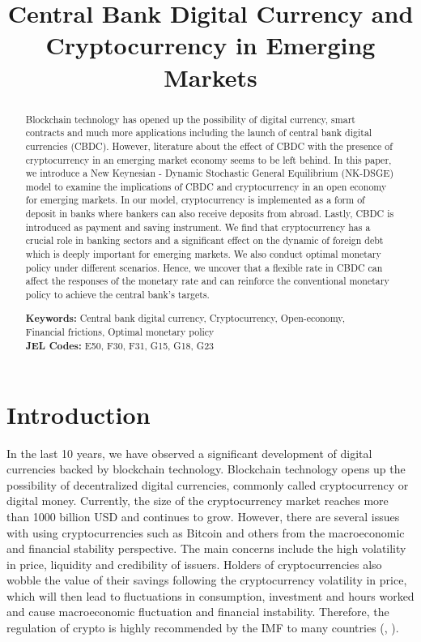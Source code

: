 \documentclass[12pt, a4paper]{article}
\title{Central Bank Digital Currency and Cryptocurrency in Emerging Markets }
\date{}
\begin{document}
\maketitle
\begin{abstract}

\noindent Blockchain technology has opened up the possibility of digital currency, smart contracts and much more applications including the launch of central bank digital currencies (CBDC). However, literature about the effect of CBDC with the presence of cryptocurrency in an emerging market economy seems to be left behind. In this paper, we introduce a New Keynesian - Dynamic Stochastic General Equilibrium (NK-DSGE) model to examine the implications of CBDC and cryptocurrency in an open economy for emerging markets. In our model, cryptocurrency is implemented as a form of deposit in banks where bankers can also receive deposits from abroad. Lastly, CBDC is introduced as payment and saving instrument. We find that cryptocurrency has a crucial role in banking sectors and a significant effect on the dynamic of foreign debt which is deeply important for emerging markets. We also conduct optimal monetary policy under different scenarios. Hence, we uncover that a flexible rate in CBDC can affect the responses of the monetary rate and can reinforce the conventional monetary policy to achieve the central bank's targets.
   
   


\noindent\textbf{Keywords:} Central bank digital currency, Cryptocurrency, Open-economy,\\ Financial frictions, Optimal monetary policy
\vspace{0in}\\
\noindent\textbf{JEL Codes:} E50, F30, F31, G15, G18, G23\\

\bigskip
\end{abstract}

\setcounter{page}{0}
\thispagestyle{empty}
\clearpage
\section{Introduction}

In the last 10 years, we have observed a significant development of digital currencies backed by blockchain technology. Blockchain technology opens up the possibility of decentralized digital currencies, commonly called cryptocurrency or digital money. Currently, the size of the cryptocurrency market reaches more than 1000 billion USD and continues to grow. However, there are several issues with using cryptocurrencies such as Bitcoin and others from the macroeconomic and financial stability perspective. The main concerns include the high volatility in price, liquidity and credibility of issuers. Holders of cryptocurrencies also wobble the value of their savings following the cryptocurrency volatility in price, which will then lead to fluctuations in consumption, investment and hours worked and cause macroeconomic fluctuation and financial instability. Therefore, the regulation of crypto is highly recommended by the IMF to many countries (\cite{imffintech}, \cite{imf2020digital}).
\end{document}
